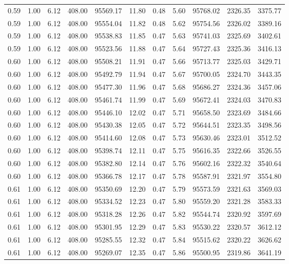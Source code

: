 \begin{table}[!ht]
\begin{tabular}{rrrrrrrrrrr}
0.59 & 1.00 & 6.12 & 408.00 & 95569.17 & 11.80 & 0.48 & 5.60 & 95768.02 & 2326.35 & 3375.77 \\
0.59 & 1.00 & 6.12 & 408.00 & 95554.04 & 11.82 & 0.48 & 5.62 & 95754.56 & 2326.02 & 3389.16 \\
0.59 & 1.00 & 6.12 & 408.00 & 95538.83 & 11.85 & 0.47 & 5.63 & 95741.03 & 2325.69 & 3402.61 \\
0.59 & 1.00 & 6.12 & 408.00 & 95523.56 & 11.88 & 0.47 & 5.64 & 95727.43 & 2325.36 & 3416.13 \\
0.60 & 1.00 & 6.12 & 408.00 & 95508.21 & 11.91 & 0.47 & 5.66 & 95713.77 & 2325.03 & 3429.71 \\
0.60 & 1.00 & 6.12 & 408.00 & 95492.79 & 11.94 & 0.47 & 5.67 & 95700.05 & 2324.70 & 3443.35 \\
0.60 & 1.00 & 6.12 & 408.00 & 95477.30 & 11.96 & 0.47 & 5.68 & 95686.27 & 2324.36 & 3457.06 \\
0.60 & 1.00 & 6.12 & 408.00 & 95461.74 & 11.99 & 0.47 & 5.69 & 95672.41 & 2324.03 & 3470.83 \\
0.60 & 1.00 & 6.12 & 408.00 & 95446.10 & 12.02 & 0.47 & 5.71 & 95658.50 & 2323.69 & 3484.66 \\
0.60 & 1.00 & 6.12 & 408.00 & 95430.38 & 12.05 & 0.47 & 5.72 & 95644.51 & 2323.35 & 3498.56 \\
0.60 & 1.00 & 6.12 & 408.00 & 95414.60 & 12.08 & 0.47 & 5.73 & 95630.46 & 2323.01 & 3512.52 \\
0.60 & 1.00 & 6.12 & 408.00 & 95398.74 & 12.11 & 0.47 & 5.75 & 95616.35 & 2322.66 & 3526.55 \\
0.60 & 1.00 & 6.12 & 408.00 & 95382.80 & 12.14 & 0.47 & 5.76 & 95602.16 & 2322.32 & 3540.64 \\
0.60 & 1.00 & 6.12 & 408.00 & 95366.78 & 12.17 & 0.47 & 5.78 & 95587.91 & 2321.97 & 3554.80 \\
0.61 & 1.00 & 6.12 & 408.00 & 95350.69 & 12.20 & 0.47 & 5.79 & 95573.59 & 2321.63 & 3569.03 \\
0.61 & 1.00 & 6.12 & 408.00 & 95334.52 & 12.23 & 0.47 & 5.80 & 95559.20 & 2321.28 & 3583.33 \\
0.61 & 1.00 & 6.12 & 408.00 & 95318.28 & 12.26 & 0.47 & 5.82 & 95544.74 & 2320.92 & 3597.69 \\
0.61 & 1.00 & 6.12 & 408.00 & 95301.95 & 12.29 & 0.47 & 5.83 & 95530.22 & 2320.57 & 3612.12 \\
0.61 & 1.00 & 6.12 & 408.00 & 95285.55 & 12.32 & 0.47 & 5.84 & 95515.62 & 2320.22 & 3626.62 \\
0.61 & 1.00 & 6.12 & 408.00 & 95269.07 & 12.35 & 0.47 & 5.86 & 95500.95 & 2319.86 & 3641.19 \\

\end{tabular}
\end{table}
